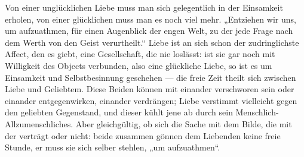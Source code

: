 Von einer unglücklichen Liebe muss man sich gelegentlich in der Einsamkeit erholen, von einer glücklichen muss man es noch viel mehr. „Entziehen wir uns, um aufzuathmen, für einen Augenblick der engen Welt, zu der jede Frage nach dem Werth von  den Geist verurtheilt.“ Liebe ist an sich schon der zudringlichste Affect, den es giebt, eine Gesellschaft, die nie loslässt: ist sie gar noch mit Willigkeit des Objects verbunden, also eine glückliche Liebe, so ist es um Einsamkeit und Selbstbesinnung geschehen — die freie Zeit theilt sich zwischen Liebe und Geliebtem. Diese Beiden können mit einander verschworen sein oder einander entgegenwirken, einander verdrängen; Liebe verstimmt vielleicht gegen den geliebten Gegenstand, und dieser kühlt jene ab durch sein Menschlich-Allzumenschliches. Aber gleichgültig, ob sich die Sache mit dem Bilde, die  mit der  verträgt oder nicht: beide zusammen gönnen dem Liebenden keine freie Stunde, er muss sie sich selber stehlen, „um aufzuathmen“.
\par

